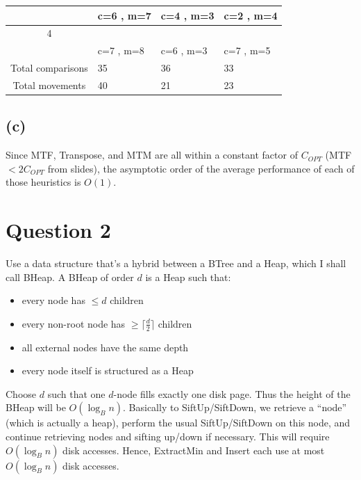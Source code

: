 \documentclass{article}[12pt]
\begin{document}
\begin{tabular}{|c|p{3.2cm}|p{3.2cm}|p{3.2cm}|}
&
c=6 \hspace{.5cm}, m=7 \hspace{.5cm} &
c=4 \hspace{.5cm}, m=3 \hspace{.5cm} &
c=2 \hspace{.5cm}, m=4 \hspace{.5cm} \\
\hline
4&
&
&
\\
&
c=7 \hspace{.5cm}, m=8 \hspace{.5cm} &
c=6 \hspace{.5cm}, m=3 \hspace{.5cm} &
c=7 \hspace{.5cm}, m=5 \hspace{.5cm} \\
\hline
\hline
\hline
Total comparisons&
35  & 36 & 33 \\
\hline
Total movements&
40  & 21 & 23 \\
\hline
\end{tabular}

\subsection*{(c)}
Since MTF, Transpose, and MTM are all within a constant factor of $C_{OPT}$ (MTF $< 2C_{OPT}$ from slides), the asymptotic order of the average performance of each of those heuristics is $O(1)$.

\section*{Question 2}
Use a data structure that's a hybrid between a BTree and a Heap, which I shall call BHeap. A BHeap of order $d$ is a Heap such that: \\
\begin{itemize}
  \item every node has $\le d$ children
  \item every non-root node has $\ge \lceil \frac{d}{2} \rceil$ children
  \item all external nodes have the same depth
  \item every node itself is structured as a Heap
\end{itemize}

Choose $d$ such that one $d$-node fills exactly one disk page. Thus the height of the BHeap will be $O(\log_{B}n)$.
Basically to SiftUp/SiftDown, we retrieve a ``node'' (which is actually a heap), perform the usual SiftUp/SiftDown on this node, and continue retrieving nodes and sifting up/down if necessary. This will require $O(\log_{B}n)$ disk accesses. Hence, ExtractMin and Insert each use at most $O(\log_{B}n)$ disk accesses.
\end{document}
